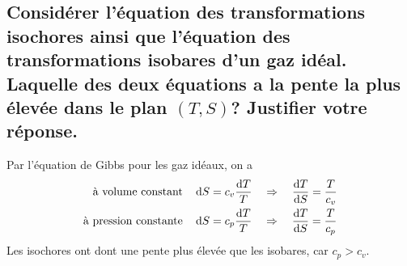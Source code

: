 \iffalse
Un gaz est dit idéal si il suit l'équation $pv = RT$. Pour l'état gazeux idéal, les chaleurs massiques $c_v$ et $c_p$ sont indépendantes du volume massique et de la pression. Il en va donc de même pour l'énergie interne $U$ et l'enthalpie $H$, puisque l'on a, en prenant l'expression de  $dS$ dans la matrice \ref{eq:matriceSideal} :
\begin{align} dU &= TdS - pdv = \frac{RT}{v}dv + c_vdT - pdv = c_vdT \\ dH &= TdS + vdp = \frac{-RT}{p}dp + c_pdT + vdp = c_pdT \end{align}
Cette propriété est connue sous le nom de \textbf{loi de Joule du gaz idéal}. Ces considérations permettent de calculer les variations de l'énergie interne et de l'enthalpie pour toute transformation du gaz idéal au moyen des relations :
\begin{align} \Delta U &= \int_{T_1}^{T_2}c_vdT \\ \Delta H &= \int_{T_1}^{T_2}c_pdT \end{align}
\fi

\subsection{Considérer l'équation des transformations isochores
ainsi que l'équation des transformations isobares d'un gaz idéal.
Laquelle des deux équations a la pente la plus élevée dans le plan $(T,S)$?
Justifier votre réponse.}
Par l'équation de Gibbs pour les gaz idéaux, on a
\begin{align*}
	\text{à volume constant}\quad & \dd{S} = c_v\frac{\dd{T}}{T} \quad
	\Rightarrow \quad \dv{T}{S} = \frac{T}{c_v} \\
	\text{à pression constante}\quad & \dd{S} = c_p\frac{\dd{T}}{T} \quad
	\Rightarrow \quad \dv{T}{S} = \frac{T}{c_p}
\end{align*}
Les isochores ont dont une pente plus élevée que les isobares, car $c_p > c_v$.

\iffalse
On reprend les équations \ref{eq:isobare_ideal} et \ref{eq:isochore_ideal} de la question \ref{q:2_2}:
\begin{align} p = C^\text{te} \qquad &\Rightarrow \qquad \frac{T_f}{T_i} = \exp\left(\frac{\Delta S}{c_p}\right) \\ v = C^\text{te}  \qquad &\Rightarrow \qquad \frac{T_f}{T_i} = \exp\left(\frac{\Delta S}{c_v}\right) \end{align}
Comme $c_p > c_v$, une transformations isochore aura une pente plus élevée dans le diagramme ($T$,$S$) qu'une transformation isobare sous les mêmes conditions initiales. Ce résultat est également visible sur le diagramme à la figure \ref{fig:TS_gaz_parfait}.
\fi

